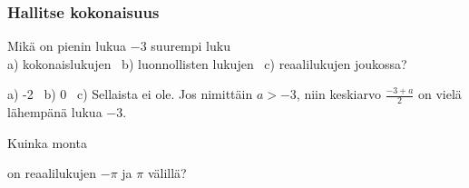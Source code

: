 \begin{tehtavasivu}
\begin{tehtava}%
\begin{alakohdat}
\end{alakohdat}
\begin{vastaus}
\begin{alakohdat}
\end{alakohdat}
\end{vastaus}
\end{tehtava}



\subsubsection*{Hallitse kokonaisuus}

\begin{tehtava}
Mikä on pienin lukua $-3$ suurempi luku \\
a) kokonaislukujen \ b) luonnollisten lukujen \ c) reaalilukujen joukossa?
\begin{vastaus}
a) -2 \ b) 0 \ c) Sellaista ei ole. Jos nimittäin $a > -3$, niin keskiarvo
$\frac{-3+a}{2}$ on vielä lähempänä lukua $-3$. 
\end{vastaus}
\end{tehtava}

\begin{tehtava}
Kuinka monta 
\begin{alakohdat}
\end{alakohdat}
on reaalilukujen \(-\pi\) ja \(\pi\) välillä?
\begin{vastaus}
\begin{alakohdat}
\end{alakohdat}
\end{vastaus}
\end{tehtava}


\end{tehtavasivu}
